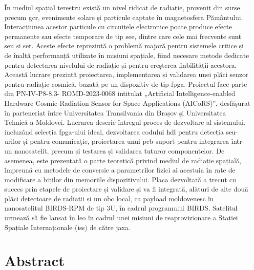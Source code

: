 \documentclass[12pt,a4paper]{report}
\begin{document}
În mediul spațial terestru există un nivel ridicat de radiație, provenit din surse precum \acrfull{gcr}, evenimente solare și particule captate în magnetosfera Pământului. Interacțiunea acestor particule cu circuitele electronice poate produce efecte permanente sau efecte temporare de tip \acrfull{see}, dintre care cele mai frecvente sunt \acrfull{seu} și \acrfull{set}. Aceste efecte reprezintă o problemă majoră pentru sistemele critice și de înaltă performanță utilizate în misiuni spațiale, fiind necesare metode dedicate pentru detectarea nivelului de radiație și pentru creșterea fiabilității acestora. Această lucrare prezintă proiectarea, implementarea și validarea unei plăci senzor pentru radiație cosmică, bazată pe un dispozitiv de tip \acrfull{fpga}. Proiectul face parte din PN-IV-P8-8.3- ROMD-2023-0068 intitulat „Artificial Intelligence-enabled Hardware Cosmic Radiation Sensor for Space Applications (AICoRS)”, desfășurat în parteneriat între Universitatea Transilvania din Brașov și Universitatea Tehnică a Moldovei. Lucrarea descrie întregul proces de dezvoltare al sistemului, incluzând selecția \gls{fpga}-ului ideal, dezvoltarea codului \acrfull{hdl} pentru detecția \gls{seu}-urilor și pentru comunicație, proiectarea unui \acrfull{pcb} suport pentru integrarea într-un nanosatelit, precum și testarea și validarea tuturor componentelor. De asemenea, este prezentată o parte teoretică privind mediul de radiație spațială, împreună cu metodele de conversie a parametrilor fizici ai acestuia în rate de modificare a biților din memoriile dispozitivului. Placa dezvoltată a trecut cu succes prin etapele de proiectare și validare și va fi integrată, alături de alte două plăci detectoare de radiații și un \acrfull{obc} local, ca payload moldovenesc în nanosatelitul BIRDS-RPM de tip 3U, în cadrul programului BIRDS. Satelitul urmează să fie lansat în \acrfull{leo} în cadrul unei misiuni de reaprovizionare a Stației Spațiale Internaționale (\gls{iss}) de către \acrfull{jaxa}.

\chapter*{Abstract}
\end{document}
